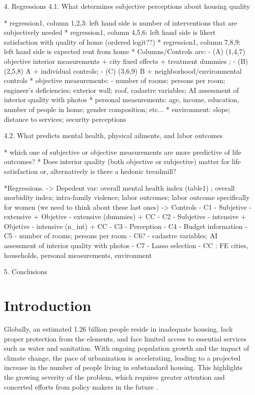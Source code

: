 4. Regressions
4.1. What determines subjective perceptions about housing quality

* regression1, column 1,2,3: left hand side is number of interventions that are subjectively needed
* regression1, column 4,5,6: left hand side is likert satisfaction with quality of home (ordered logit??)
* regression1, column 7,8,9: left hand side is expected rent from home
* Columns/Controls are: 
        - (A) (1,4,7) objective interior measurements + city fixed effects + treatment dummies ; 
        - (B) (2,5,8) A + individual controls; 
        - (C) (3,6,9) B + neighborhood/environmental controls
* objective measurements: 
        - number of rooms; persons per room;  engineer's deficiencies; exterior wall; roof, cadastre variables; AI assessment of interior quality with photos
* personal measurements: age, income, education, number of people in home; gender composition; etc...
* environment: slope; distance to services; security perceptions

4.2. What predicts mental health, physical ailments, and labor outcomes

* which one of subjective or objective measurements are more predictive of life outcomes? 
* Does interior quality (both objective or subjective) matter for life satisfaction or, alternatively is there a hedonic treadmill?

*Regressions. 
    -> Depedent var: overall mental health index (table1) ; overall morbidity index; intra-family violence; labor outcomes; labor outcome specifically for women (we need to think about these last ones)
    -> Controls
        - C1 - Subjetive - extensive + Objetive - extensive (dummies) + CC
        - C2 - Subjetive - intensive + Objetive - intensive  (n_int)  + CC
        - C3 - Perception 
        - C4 - Budget information
        - C5 - number of rooms; persons per room
        - C6? - cadastre variables; AI assessment of interior quality with photos
        - C7 - Lasso selection
        - CC : FE cities, households, personal measurements, environment
 

5. Conclusions

\newpage
\section{Introduction}

        Globally, an estimated 1.26 billion people reside in inadequate housing, lack proper protection from the elements, and face limited access to essential services such as water and sanitation. With ongoing population growth and the impact of climate change, the pace of urbanization is accelerating, leading to a projected increase in the number of people living in substandard housing. This highlights the growing severity of the problem, which requires greater attention and concerted efforts from policy makers in the future \cite{behr2021introducing}.  \\
        
